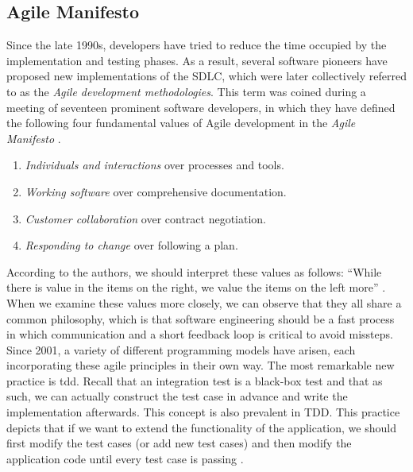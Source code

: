 
\subsection{Agile Manifesto}
Since the late 1990s, developers have tried to reduce the time occupied by the implementation and testing phases. As a result, several software pioneers have proposed new implementations of the SDLC, which were later collectively referred to as the \emph{Agile development methodologies}. This term was coined during a meeting of seventeen prominent software developers, in which they have defined the following four fundamental values of Agile development in the \emph{Agile Manifesto} \cite{beck2001agile}.

\begin{enumerate}
	\item \emph{Individuals and interactions} over processes and tools.
	\item \emph{Working software} over comprehensive documentation.
	\item \emph{Customer collaboration} over contract negotiation.
	\item \emph{Responding to change} over following a plan.
\end{enumerate}

\noindent According to the authors, we should interpret these values as follows: ``While there is value in the items on the right, we value the items on the left more'' \cite{beck2001agile}. When we examine these values more closely, we can observe that they all share a common philosophy, which is that software engineering should be a fast process in which communication and a short feedback loop is critical to avoid missteps. Since 2001, a variety of different programming models have arisen, each incorporating these agile principles in their own way. The most remarkable new practice is \acrfull{tdd}. Recall that an integration test is a black-box test and that as such, we can actually construct the test case in advance and write the implementation afterwards. This concept is also prevalent in TDD. This practice depicts that if we want to extend the functionality of the application, we should first modify the test cases (or add new test cases) and then modify the application code until every test case is passing \cite{10.5555/579193}.